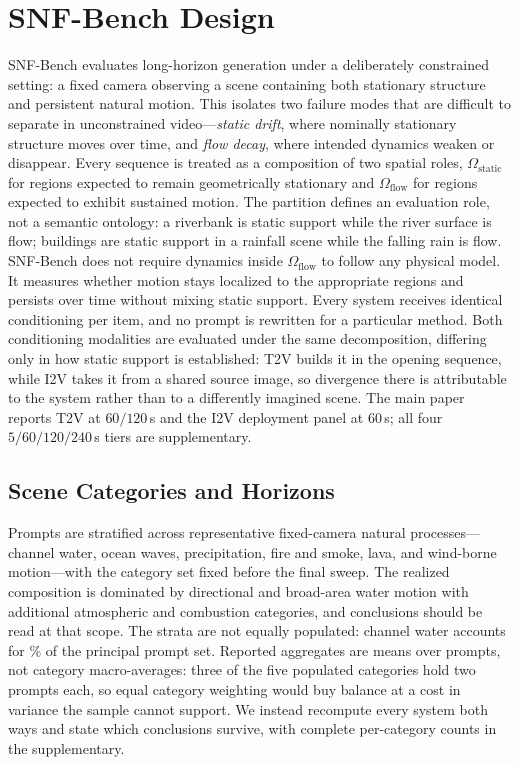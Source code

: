\section{SNF-Bench Design}
\label{sec:benchmark}

SNF-Bench evaluates long-horizon generation under a deliberately constrained setting: a fixed camera observing a scene containing both stationary structure and persistent natural motion. This isolates two failure modes that are difficult to separate in unconstrained video---\emph{static drift}, where nominally stationary structure moves over time, and \emph{flow decay}, where intended dynamics weaken or disappear. Every sequence is treated as a composition of two spatial roles, $\Omega_{\mathrm{static}}$ for regions expected to remain geometrically stationary and $\Omega_{\mathrm{flow}}$ for regions expected to exhibit sustained motion. The partition defines an evaluation role, not a semantic ontology: a riverbank is static support while the river surface is flow; buildings are static support in a rainfall scene while the falling rain is flow. SNF-Bench does not require dynamics inside $\Omega_{\mathrm{flow}}$ to follow any physical model. It measures whether motion stays localized to the appropriate regions and persists over time without mixing static support. Every system receives identical conditioning per item, and no prompt is rewritten for a particular method. Both conditioning modalities are evaluated under the same decomposition, differing only in how static support is established: T2V builds it in the opening sequence, while I2V takes it from a shared source image, so divergence there is attributable to the system rather than to a differently imagined scene. The main paper reports T2V at $60/120$\,s and the I2V deployment panel at $60$\,s; all four $5/60/120/240$\,s tiers are supplementary.

\subsection{Scene Categories and Horizons}
\label{sec:categories}

Prompts are stratified across representative fixed-camera natural processes---channel water, ocean waves, precipitation, fire and smoke, lava, and wind-borne motion---with the category set fixed before the final sweep. The realized composition is dominated by directional and broad-area water motion with additional atmospheric and combustion categories, and conclusions should be read at that scope. The strata are not equally populated: channel water accounts for \SNFtopCatShare\% of the principal prompt set. Reported aggregates are means over prompts, not category macro-averages: three of the five populated categories hold two prompts each, so equal category weighting would buy balance at a cost in variance the sample cannot support. We instead recompute every system both ways and state which conclusions survive, with complete per-category counts in the supplementary.

